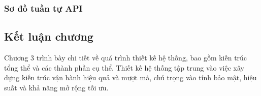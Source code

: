 



\subsubsection{Sơ đồ tuần tự API}




\subsection{Kết luận chương}

Chương 3 trình bày chi tiết về quá trình thiết kế hệ thống, bao gồm kiến trúc tổng thể và các thành phần cụ thể.
Thiết kế hệ thống tập trung vào việc xây dựng kiến trúc vận hành hiệu quả và mượt mà, chú trọng vào tính bảo mật, hiệu suất và khả năng mở rộng tối ưu.
\newpage